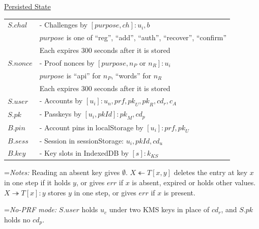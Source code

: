\documentclass{article}
\newlength{\stanzagap}
\newlength{\notegap}
\newlength{\stanzawidth}
\newlength{\stanzabox}
\newenvironment{stanza}[1][\stanzawidth]
  {\par\addvspace{\stanzagap}%
   \setlength{\stanzabox}{\dimexpr\linewidth-\parindent\relax}%
   \ifdim\stanzabox>#1\setlength{\stanzabox}{#1}\fi
   \noindent\hspace*{\parindent}\begin{minipage}{\stanzabox}}
  {\end{minipage}\par\addvspace{\stanzagap}}
\begin{document}
\begin{stanza}
\underline{Persisted State}\\

\begin{tabular}{@{}l l}
$S.\mathit{chal}$ & \textrm{ - Challenges by }$[\mathit{purpose}, \mathit{ch}] : u_i, b$\\
& \phantom{\textrm{ - }}$\mathit{purpose}$\textrm{ is one of ``reg'', ``add'', ``auth'', ``recover'', ``confirm''}\\
& \phantom{\textrm{ - }}\textrm{Each expires 300 seconds after it is stored}\\
$S.\mathit{nonce}$ & \textrm{ - Proof nonces by }$[\mathit{purpose}, n_P\textrm{ or }n_R] : u_i$\\
& \phantom{\textrm{ - }}$\mathit{purpose}$\textrm{ is ``api'' for }$n_P$\textrm{, ``words'' for }$n_R$\\
& \phantom{\textrm{ - }}\textrm{Each expires 300 seconds after it is stored}\\
$S.\mathit{user}$ & \textrm{ - Accounts by }$[u_i] : u_n, \mathit{prf}, \mathit{pk}_U, \mathit{pk}_R, \mathit{cd}_r, c_A$\\
$S.\mathit{pk}$ & \textrm{ - Passkeys by }$[u_i, \mathit{pkId}] : \mathit{pk}_M, \mathit{cd}_p$\\
$B.\mathit{pin}$ & \textrm{ - Account pins in localStorage by }$[u_i] : \mathit{prf}, \mathit{pk}_U$\\
$B.\mathit{sess}$ & \textrm{ - Session in sessionStorage: }$u_i, \mathit{pkId}, \mathit{cd}_u$\\
$B.\mathit{key}$ & \textrm{ - Key slots in IndexedDB by }$[s] : k_{\mathit{KS}}$\\
\end{tabular}

\vspace{\notegap}

{\leftskip=\parindent\noindent\textit{Notes:} Reading an absent key gives $\emptyset$. $X \twoheadleftarrow T[x, y]$ deletes the entry at key $x$ in one step if it holds $y$, or gives $\mathit{err}$ if $x$ is absent, expired or holds other values. $X \twoheadrightarrow T[x] : y$ stores $y$ in one step, or gives $\mathit{err}$ if $x$ is present.\par}

\vspace{\notegap}

{\leftskip=\parindent\noindent\textit{No-PRF mode:} $S.\mathit{user}$ holds $u_c$ under two KMS keys in place of $\mathit{cd}_r$, and $S.\mathit{pk}$ holds no $\mathit{cd}_p$.\par}
\end{stanza}
\end{document}
